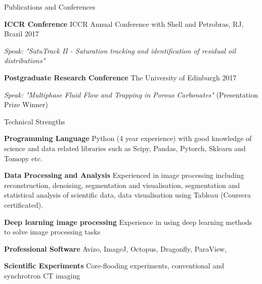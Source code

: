\documentclass{resume} %
\newenvironment{indentpar}[1]%
  {\begin{list}{}%
          {\setlength{\leftmargin}{#1}}%
          \item[]%
  }
  {\end{list}}
\begin{document}
\begin{rSection}{Publications and Conferences}
\begin{indentpar}{0.5cm}
\textbf{ICCR Conference} ICCR Annual Conference with Shell and Petrobras, RJ, Brazil \hfill {2017}
\begin{indentpar}{0.5cm}
\textit {Speak: "SatuTrack II - Saturation tracking and identification of residual oil distributions"}
\end{indentpar}

\textbf{Postgraduate Research Conference} The University of Edinburgh \hfill {2017} 
\begin{indentpar}{0.5cm}
\textit {Speak: "Multiphase Fluid Flow and Trapping in Porous Carbonates"} (Presentation Prize Winner)
\end{indentpar}
\end{indentpar}
\end{rSection}

\begin{rSection}{Technical Strengths}

\begin{indentpar}{0.5cm}
\textbf{Programming Language} Python (4 year experience) with good knowledge of science and data related libraries such as Scipy, Pandas, Pytorch, Sklearn and Tomopy etc. 

\textbf{Data Processing and Analysis}  Experienced in image processing including reconstruction, denoising, segmentation and visualisation,  segmentation and statistical analysis of scientific data, data visualisation using Tableau (Coursera certificated).

\textbf{Deep learning image processing} Experience in using deep learning methods to solve image processing tasks

\textbf{Professional Software} Avizo, ImageJ, Octopus, Dragonfly, ParaView, 

\textbf{Scientific Experiments}  Core-flooding experiments, conventional and synchrotron CT imaging 

\end{indentpar}
\end{rSection}
\end{document}
